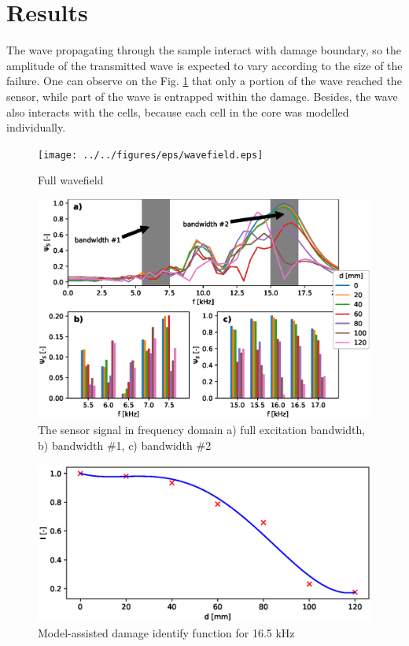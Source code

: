 \documentclass[materials,article,submit,moreauthors,pdftex]{Definitions/mdpi}
\begin{document}
\section{Results}
\label{sec:results}
The wave propagating through the sample interact with damage boundary, so the amplitude of the transmitted wave is expected to vary according to the size of the failure.
One can observe on the Fig. \ref{fig:wavefield} that only a portion of the wave reached the sensor, while part of the wave is entrapped within the damage.
Besides, the wave also interacts with the cells, because each cell in the core was modelled individually.
\begin{figure}
	\begin{center}
		\texttt{[image: ../../figures/eps/wavefield.eps]}
	\end{center}
	\caption{Full wavefield}
	\label{fig:wavefield}
\end{figure}
\begin{figure}
	\begin{center}
		\includegraphics[width=1\linewidth]{../../figures/eps/mgntPhiFFT.eps}
	\end{center}
	\caption{The sensor signal in frequency domain a) full excitation bandwidth, b) bandwidth \#1, c) bandwidth \#2}
	\label{fig:signals}
\end{figure}
\begin{figure}[H]
	\begin{center}
		\includegraphics[width=1\linewidth]{../../figures/eps/madif.eps}
	\end{center}
	\caption{Model-assisted damage identify function for 16.5 kHz}
	\label{fig:madif}
\end{figure}
\end{document}
